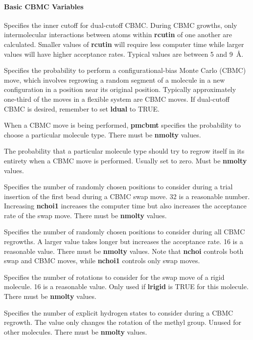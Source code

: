 \documentclass[12pt,letterpaper]{article}
\begin{document}
\paragraph{Basic CBMC Variables}

 Specifies the inner cutoff for
dual-cutoff CBMC. During CBMC growths, only intermolecular
interactions between atoms within {\bf rcutin} of one
another are calculated. Smaller values of {\bf rcutin} will
require less computer time while larger values will have
higher acceptance rates. Typical values are between 5 and
9~\AA.

 Specifies the probability to perform a
configurational-bias Monte Carlo (CBMC) move, which involves
regrowing a random segment of a molecule in a new
configuration in a position near its original position.
Typically approximately one-third of the moves in a flexible
system are CBMC moves. If dual-cutoff CBMC is desired,
remember to set {\bf ldual} to TRUE.

 When a CBMC move is being performed,
{\bf pmcbmt} specifies the probability to choose a particular
molecule type. There must be {\bf nmolty} values.

 The probability that a particular
molecule type should try to regrow itself in its entirety
when a CBMC move is performed. Usually set to zero. Must be
{\bf nmolty} values.

 Specifies the number of randomly
chosen positions to consider during a trial insertion of the
first bead during a CBMC swap move. 32 is a reasonable
number. Increasing {\bf nchoi1} increases the computer time
but also increases the acceptance rate of the swap move.
There must be {\bf nmolty} values.

 Specifies the number of randomly
chosen positions to consider during all CBMC regrowths. A
larger value takes longer but increases the acceptance rate.
16 is a reasonable value. There must be {\bf nmolty} values.
Note that {\bf nchoi} controls both swap and CBMC moves,
while {\bf nchoi1} controls only swap moves.

 Specifies the number of rotations to
consider for the swap move of a rigid molecule. 16 is a
reasonable value. Only used if {\bf lrigid} is TRUE for this
molecule. There must be {\bf nmolty} values.

 Specifies the number of explicit
hydrogen states to consider during a CBMC regrowth. The
value only changes the rotation of the methyl group. Unused
for other molecules. There must be {\bf nmolty} values.
\end{document}
